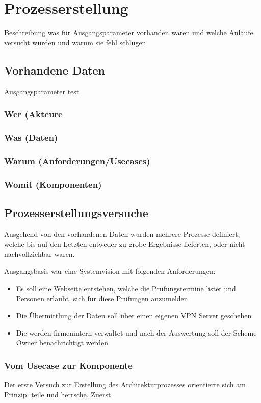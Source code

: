 \chapter{Prozesserstellung}
Beschreibung was für Ausgangsparameter vorhanden waren und welche Anläufe versucht wurden und warum sie fehl schlugen

\section{Vorhandene Daten}
Ausgangsparameter test
\subsection{Wer (Akteure}
\subsection{Was (Daten)}
\subsection{Warum (Anforderungen/Usecases)}
\subsection{Womit (Komponenten)}

\section{Prozesserstellungsversuche}
Ausgehend von den vorhandenen Daten wurden mehrere Prozesse definiert, welche bis auf den Letzten entweder zu grobe Ergebnisse lieferten, oder nicht nachvollziehbar waren.

Ausgangsbasis war eine Systemvision mit folgenden Anforderungen:

\begin{itemize}
  \item Es soll eine Webseite entstehen, welche die Prüfungstermine listet und Personen erlaubt, sich für diese Prüfungen anzumelden
  \item Die Übermittlung der Daten soll über einen eigenen VPN Server geschehen
  \item Die werden firmenintern verwaltet und nach der Auswertung soll der Scheme Owner benachrichtigt werden
\end{itemize}

\subsection{Vom Usecase zur Komponente}
Der erste Versuch zur Erstellung des Architekturprozesses orientierte sich am Prinzip: teile und herrsche. Zuerst

